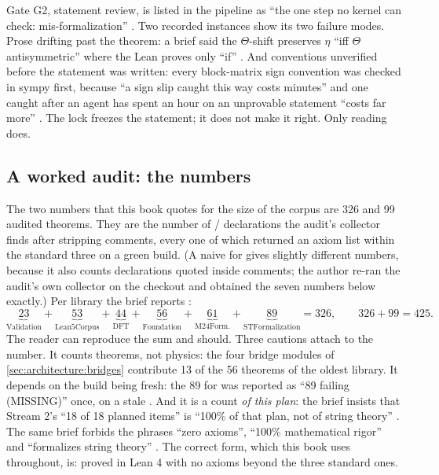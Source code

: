 \begin{pitfallbox}
Gate G2, statement review, is listed in the pipeline as ``the one step no kernel can check:
mis-formalization'' . Two recorded instances show
its two failure modes. Prose drifting past the theorem: a brief said the $\Theta$-shift
preserves $\eta$ ``iff $\Theta$ antisymmetric'' where the Lean proves only ``if''
. And conventions unverified before the statement was
written: every block-matrix sign convention was checked in sympy first, because ``a sign
slip caught this way costs minutes'' and one caught after an agent has spent an hour on an
unprovable statement ``costs far more'' . The lock
freezes the statement; it does not make it right. Only reading does.
\end{pitfallbox}

\subsection{A worked audit: the numbers}\label{sec:architecture:numbers}

The two numbers that this book quotes for the size of the corpus are 326 and 99 audited
theorems. They are the number of / declarations the audit's
collector finds after stripping comments, every one of which returned an axiom list within
the standard three on a green build. (A naive  for  gives slightly different numbers, because it also counts declarations quoted
inside comments; the author re-ran the audit's own collector on the checkout and obtained
the seven numbers below exactly.) Per library the brief reports
:
\[
\underbrace{23}_{\text{Validation}}+\underbrace{53}_{\text{Lean5Corpus}}
+\underbrace{44}_{\text{DFT}}+\underbrace{56}_{\text{Foundation}}
+\underbrace{61}_{\text{M24Form.}}+\underbrace{89}_{\text{STFormalization}}=326,
\qquad 326+99=425 .
\]
The reader can reproduce the sum and should. Three cautions attach to the number. It counts
theorems, not physics: the four bridge modules of \cref{sec:architecture:bridges}
contribute 13 of the 56 theorems of the oldest library. It
depends on the build being fresh: the 89 for  was reported
as ``89 failing (MISSING)'' once, on a stale  . And it is a count \emph{of this plan}: the brief insists that Stream 2's
``18 of 18 planned items'' is ``100\% of that plan, not of string theory''
. The same brief forbids the phrases ``zero
axioms'', ``100\% mathematical rigor'' and ``formalizes string theory''
. The correct form, which this book uses
throughout, is: proved in Lean 4 with no axioms beyond the three standard ones.

